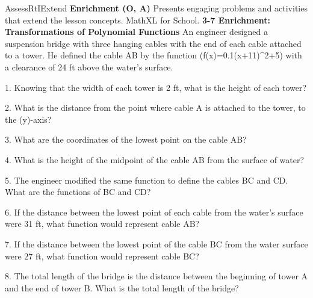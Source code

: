 \documentclass{article}
\newenvironment{te-addendum}[2]{}{}     %
\newcommand{\answer}[1]{}               %
\newcommand{\placeholder}[2]{}          %
\newcommand{\te}[1]{}                   %
\begin{document}
\begin{te-addendum}{Assess}{RtIExtend}
\textbf{Enrichment (O, A)} Presents engaging problems and activities that extend the lesson concepts. MathXL for School.
\textbf{3-7 Enrichment: Transformations of Polynomial Functions}
An engineer designed a suspension bridge with three hanging cables with the end of each cable attached to a tower. He defined the cable AB by the function (f(x)=0.1(x+11)^2+5) with a clearance of 24 ft above the water's surface.
\placeholder{diagram}{Suspension bridge with four towers A,B,C,D from left to right, three upward curved cables AB,BC,CD and vertical hangers to horizontal deck on x-axis. y-axis through B, x-axis points right. Labels Cable, Tower at left, Width of Cable across BC, Surface of water at gray band below deck, vertical double arrow Clearance between water and deck. No numbered ticks.}
1. Knowing that the width of each tower is 2 ft, what is the height of each tower?
\answer{15 ft}
2. What is the distance from the point where cable A is attached to the tower, to the (y)-axis?
\answer{21 ft}
3. What are the coordinates of the lowest point on the cable AB?
\answer{(-11,5)}
4. What is the height of the midpoint of the cable AB from the surface of water?
\answer{29 ft}
5. The engineer modified the same function to define the cables BC and CD. What are the functions of BC and CD?
\answer{BC: (g(x)=0.1(x-11)^2+5); CD: (h(x)=0.1(x-33)^2+5)}
6. If the distance between the lowest point of each cable from the water's surface were 31 ft, what function would represent cable AB?
\answer{(f(x)=0.1(x+11)^2+8)}
7. If the distance between the lowest point of the cable BC from the water surface were 27 ft, what function would represent cable BC?
\answer{(f(x)=0.1(x+11)^2+8)}
8. The total length of the bridge is the distance between the beginning of tower A and the end of tower B. What is the total length of the bridge?
\answer{68 ft}
\te{Printed answers 6 and 7 repeat +8, inconsistent with the stated 24-ft clearance and requested heights. Item 7 also uses the AB shift for BC. Item 8 says tower B although the full bridge ends at D.}
\end{te-addendum}
\end{document}
